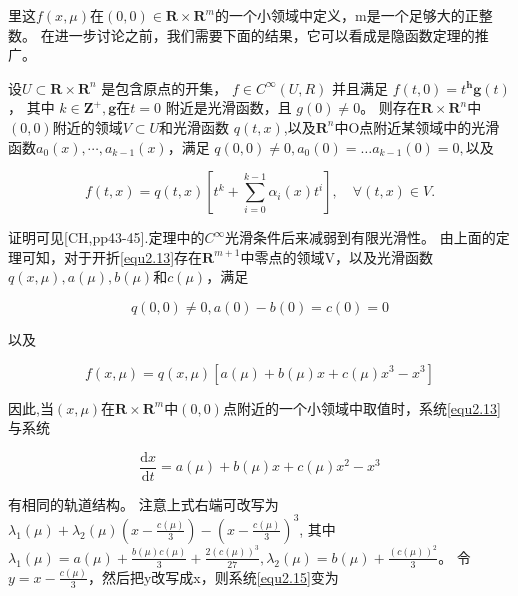   里这$f ( x , \mu ) $在$( 0,0 ) \in \mathbf { R } \times \mathbf { R } ^ { m }$的一个小领域中定义，m是一个足够大的正整数。
  在进一步讨论之前，我们需要下面的结果，它可以看成是隐函数定理的推广。

  \begin{theorem}[Malgrange定理]
    设$U \subset \mathbf { R } \times \mathbf { R } ^ { n }$
    是包含原点的开集，
    $f \in C ^ { \infty } ( U , R )$
    并且满足
    $f ( t , 0 ) = t ^ { \mathbf { h } } \mathbf { g } ( t )$，
    其中
    $k \in \mathbf { Z } ^ { + } , \boldsymbol { g }$在$t = 0$
    附近是光滑函数，且
    $g ( 0 ) \neq 0$。
    则存在$\mathbf { R } \times \mathbf { R } ^ { n }$中\((0,0)\)附近的领域\(V\subset U\)和光滑函数 \(q(t,x)\),以及\(\mathbf{R}^n\)中O点附近某领域中的光滑函数$a _ { 0 } ( x ) , \cdots , a _ { k - 1 } ( x )$，满足
    $q ( 0,0 ) \neq 0 , a_{ 0 } ( 0 ) = \dots a_{ k - 1 } ( 0 ) = 0,$以及
    
    \begin{equation}
f ( t , x ) = q ( t , x ) \left[ t ^ { k } + \sum _ { i = 0 } ^ { k-1 } \alpha _ { i } ( x ) t ^ { i } \right] , \quad \forall ( t , x ) \in V.
\end{equation}

\end{theorem}

    证明可见[CH,pp43-45].定理中的\(C^\infty\)光滑条件后来减弱到有限光滑性。
    由上面的定理可知，对于开折\ref{equ2.13}存在\(\mathbf{R}^{m+1}\)中零点的领域V，以及光滑函数$q ( x , \mu ) , a ( \mu ) , b ( \mu )$和$c ( \mu )$，满足
    
    \begin{equation}
      q ( 0,0 ) \neq 0 , a ( 0 ) - b ( 0 ) = c ( 0 ) = 0
      \label{equ2.13}
    \end{equation}
    
    以及
    
    \[
      f ( x , \mu ) = q ( x , \mu ) \left[ a ( \mu ) + b ( \mu ) x + c ( \mu ) x ^ { 3 } - x ^ { 3 } \right]
    \]
    
    因此,当$( x , \mu )$在$\mathbf { R } \times \mathbf { R } ^ { m }$中\((0,0)\)点附近的一个小领域中取值时，系统\ref{equ2.13}与系统
    
    \begin{equation}
      \frac { \mathrm { d } x } { \mathrm { d } t } = a ( \mu ) + b ( \mu ) x + c ( \mu ) x ^ { 2 } - x ^ { 3 }
      \label{equ2.15}
    \end{equation}
    
    有相同的轨道结构。
    注意上式右端可改写为$\lambda _ { 1 } ( \mu ) +\lambda _ {2 } ( \mu ) \left( x - \frac { c ( \mu ) } { 3 } \right) - \left( x - \frac { c ( \mu ) } { 3 } \right) ^ { 3 }$,
    其中$\lambda _ { 1 } ( \mu ) = a ( \mu ) + \frac { b ( \mu ) c ( \mu ) } { 3 }+ \frac { 2 ( c ( \mu ) ) ^ { 3 } } { 27 } , \lambda _ { 2 } ( \mu ) = b ( \mu ) + \frac { ( c ( \mu ) ) ^ { 2 } } { 3 }$。
    令$y = x - \frac { c ( \mu ) } { 3 }$，然后把y改写成x，则系统\ref{equ2.15}变为
    
